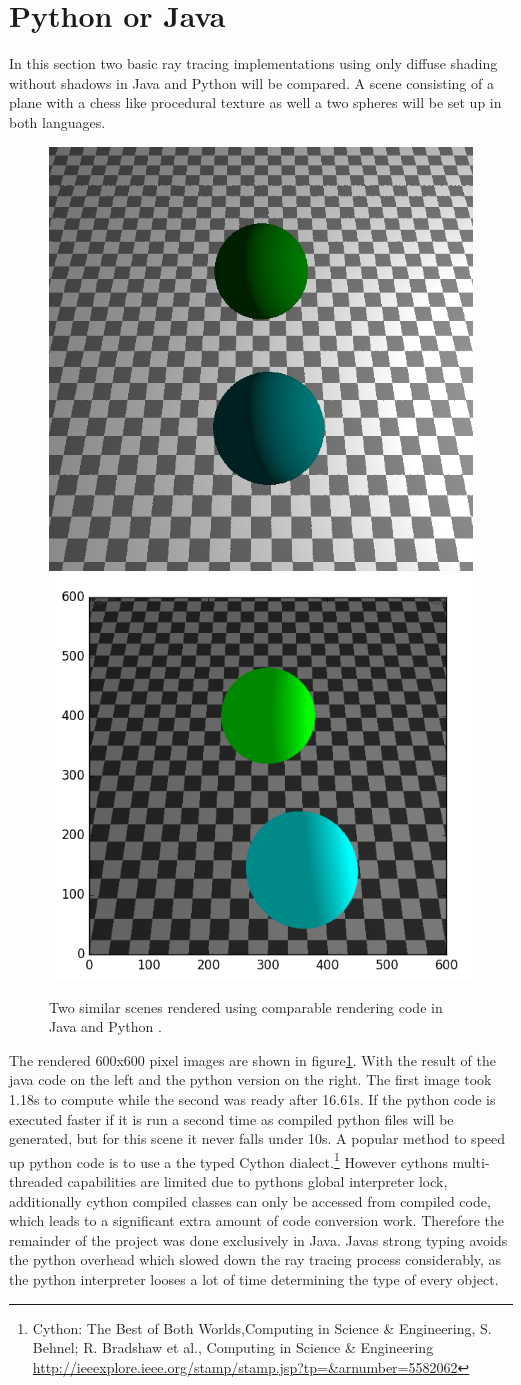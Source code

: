 \section{Python or Java}
In this section two basic ray tracing implementations using only diffuse shading without shadows in Java and Python will be compared. A scene consisting of a plane with a chess like procedural texture as well a two spheres will be set up in both languages. 
\begin{figure}
\centering
\includegraphics[width=0.35\linewidth]{./img/javaSphere2}
\includegraphics[width=0.40\linewidth]{./img/spherePython}
\caption{Two similar scenes rendered using comparable rendering code in Java and Python .}
\label{fig:spherePython}
\end{figure}
The rendered 600x600 pixel images are shown in figure\ref{fig:spherePython}. With the result of the java code on the left and the python version on the right. The first image took 1.18s  to compute while the second was ready after 16.61s. If the python code is executed faster if it is run a second time as compiled python files will be generated, but for this scene it never falls under 10s. A popular method to speed up python code is to use a the typed Cython dialect.\footnote{Cython: The Best of Both Worlds,Computing in Science \& Engineering, S. Behnel; R. Bradshaw et al., Computing in Science \& Engineering \url{http://ieeexplore.ieee.org/stamp/stamp.jsp?tp=&arnumber=5582062}} However cythons multi-threaded capabilities are limited due to pythons global interpreter lock, additionally cython compiled classes can only be accessed from compiled code, which leads to a significant extra amount of code conversion work. Therefore the remainder of the project was done exclusively in Java. Javas strong typing avoids the python overhead which slowed down the ray tracing process considerably, as the python interpreter looses a lot of time determining the type of every object. 
